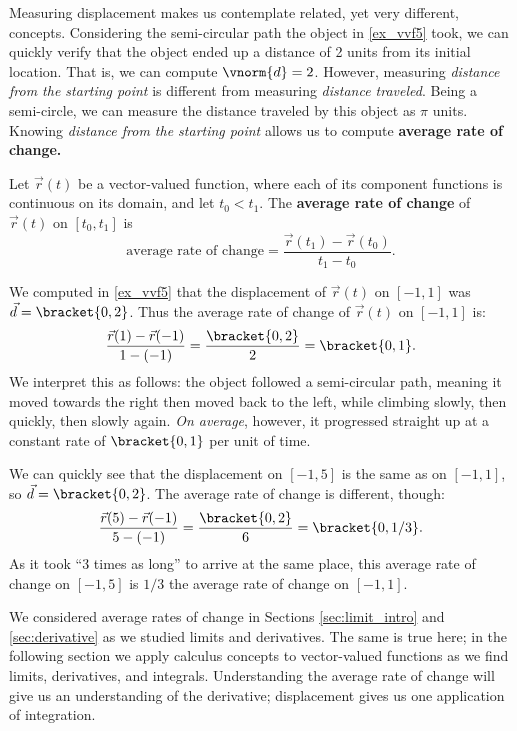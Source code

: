 Measuring displacement makes us contemplate related, yet very different, concepts. Considering the semi-circular path the object in \autoref{ex_vvf5} took, we can quickly verify that the object ended up a distance of 2 units from its initial location. That is, we can compute $\vnorm{d} = 2$. However, measuring \emph{distance from the starting point} is different from measuring \emph{distance traveled}. Being a semi-circle, we can measure the distance traveled by this object as $\pi%
$ units. Knowing \emph{distance from the starting point} allows us to compute \textbf{average rate of change.}

{Let $\vec r(t)$ be a vector-valued function, where each of its component functions is continuous on its domain, and let $t_0<t_1$. The \textbf{average rate of change} of $\vec r(t)$ on $[t_0,t_1]$ is
\[\text{average rate of change} = \frac{\vec r(t_1) - \vec r(t_0)}{t_1-t_0}.\]}

{We computed in \autoref{ex_vvf5} that the displacement of $\vec r(t)$ on $[-1,1]$ was $\vec d =\bracket{0,2}$. Thus the average rate of change of $\vec r(t)$ on $[-1,1]$ is:
\[\frac{\vec r(1) -\vec r(-1)}{1-(-1)} = \frac{\bracket{0,2}}{2} =\bracket{0,1}.\]
We interpret this as follows: the object followed a semi-circular path, meaning it moved towards the right then moved back to the left, while climbing slowly, then quickly, then slowly again. \emph{On average}, however, it progressed straight up at a constant rate of $\bracket{0,1}$ per unit of time.

We can quickly see that the displacement on $[-1,5]$ is the same as on $[-1,1]$, so $\vec d =\bracket{0,2}$. The average rate of change is different, though:
\[\frac{\vec r(5)-\vec r(-1)}{5-(-1)} = \frac{\bracket{0,2}}{6} =\bracket{0,1/3}.\]
As it took ``3 times as long'' to arrive at the same place, this average rate of change on $[-1,5]$ is $1/3$ the average rate of change on $[-1,1]$.}

We considered average rates of change in Sections \ref{sec:limit_intro} and \ref{sec:derivative} as we studied limits and derivatives. The same is true here; in the following section we apply calculus concepts to vector-valued functions as we find limits, derivatives, and integrals. Understanding the average rate of change will give us an understanding of the derivative; displacement gives us one application of integration.

